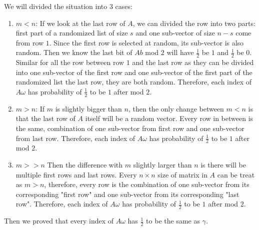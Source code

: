 \documentclass[11pt]{article}
\begin{document}
\begin{solution}
\begin{enumerate}[(a)]
    We will divided the situation into $3$ cases:
    \begin{enumerate}[($1$)]
        \item $m < n$: If we look at the last row of $A$, we can divided the row into two parts: first part of a randomized list of size $s$ and one sub-vector of size $n-s$ come from row $1$. Since the first row is selected at random, its sub-vector is also random. Then we know the last bit of $Ab$ mod $2$ will have $\frac{1}{2}$ be $1$ and $\frac{1}{2}$ be $0$. Similar for all the row between row $1$ and the last row as they can be divided into one sub-vector of the first row and one sub-vector of the first part of the randomized list the last row, they are both random. Therefore, each index of $A\omega$ has probability of $\frac{1}{2}$ to be $1$ after mod $2$.  
        \item $m > n$: If $m$ is slightly bigger than $n$, then the only change between $m<n$ is that the last row of $A$ itself will be a random vector. Every row in between is the same, combination of one sub-vector from first row and one sub-vector from last row. Therefore, each index of $A\omega$ has probability of $\frac{1}{2}$ to be $1$ after mod $2$. 
        \item $m >> n$ Then the difference with $m$ slightly larger than $n$ is there will be multiple first rows and last rows. Every $n \times n$ size of matrix in $A$ can be treat as $m>n$, therefore, every row is the combination of one sub-vector from its corresponding "first row" and one sub-vector from its corresponding "last row". Therefore, each index of $A\omega$ has probability of $\frac{1}{2}$ to be $1$ after mod $2$.
    \end{enumerate}
    Then we proved that every index of $A\omega$ has $\frac{1}{2}$ to be the same as $\gamma$.
    
    \newline
    

\end{enumerate}
\end{solution}
\end{document}
